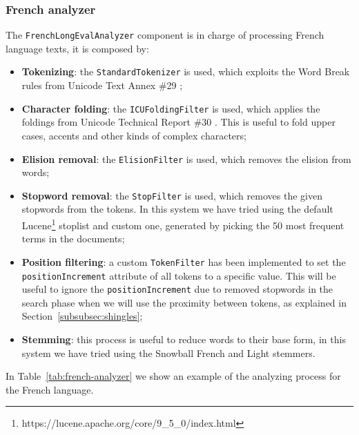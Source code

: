 \subsubsection{French analyzer}

The \texttt{FrenchLongEvalAnalyzer} component is in charge of processing French language texts, it is composed by:
\begin{itemize}
    \item \textbf{Tokenizing}: the \texttt{StandardTokenizer} is used, which exploits the Word Break rules from Unicode Text Annex \#29 \citep{UAX29};
    \item \textbf{Character folding}: the \texttt{ICUFoldingFilter} is used, which applies the foldings from Unicode Technical Report \#30 \citep{UTR30}. This is useful to fold upper cases, accents and other kinds of complex characters;
    \item \textbf{Elision removal}: the \texttt{ElisionFilter} is used, which removes the elision from words;
    \item \textbf{Stopword removal}: the \texttt{StopFilter} is used, which removes the given stopwords from the tokens. In this system we have tried using the default Lucene\footnote{https://lucene.apache.org/core/9\_5\_0/index.html} stoplist and custom one, generated by picking the 50 most frequent terms in the documents;
    \item \textbf{Position filtering}: a custom \texttt{TokenFilter} has been implemented to set the \texttt{position\-Increment} attribute of all tokens to a specific value. This will be useful to ignore the \texttt{positionIncrement} due to removed stopwords in the search phase when we will use the proximity between tokens, as explained in Section~\ref{subsubsec:shingles};
    \item \textbf{Stemming}: this process is useful to reduce words to their base form, in this system we have tried using the Snowball French \citep{FrSnowball} and Light \citep{LightStem} stemmers.
\end{itemize}

In Table~\ref{tab:french-analyzer} we show an example of the analyzing process for the French language.

